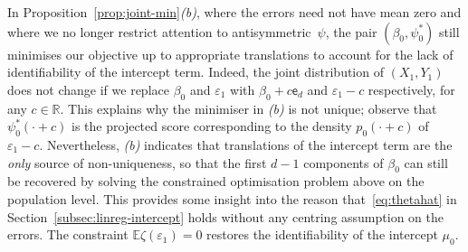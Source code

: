 \documentclass[a4paper]{article}
\newcommand{\R}{\mathbb{R}}
\newcommand{\E}{\mathbb{E}}
\theoremstyle{definition}
\begin{document}
In Proposition~\ref{prop:joint-min}\emph{(b)}, where the errors need not have mean zero and where we no longer restrict attention to antisymmetric~$\psi$, the pair $(\beta_0,\psi_0^*)$ still minimises our objective up to appropriate translations to account for the lack of identifiability of the intercept term. Indeed, the joint distribution of $(X_1,Y_1)$ does not change if we replace $\beta_0$ and $\varepsilon_1$ with $\beta_0 + c \mathsf{e}_d$ and $\varepsilon_1 - c$ respectively, for any $c \in \R$. This explains why the minimiser in \emph{(b)} is not unique; observe that $\psi_0^*(\cdot + c)$ is the projected score corresponding to the density $p_0(\cdot + c)$ of $\varepsilon_1 - c$. Nevertheless, \emph{(b)} indicates that translations of the intercept term are the \textit{only} source of non-uniqueness, so that the first $d-1$ components of $\beta_0$ can still be recovered by solving the constrained optimisation problem above on the population level. This provides some insight into the reason that~\eqref{eq:thetahat} in Section~\ref{subsec:linreg-intercept} holds without any centring assumption on the errors. The constraint $\E\zeta(\varepsilon_1) = 0$ restores the identifiability of the intercept $\mu_0$.
\end{document}
